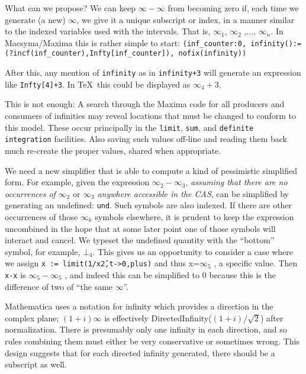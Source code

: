 \documentclass{article}
\begin{document}
What can we propose?  We can keep $\infty - \infty$ from becoming zero
if, each time we generate (a new) $\infty$, we give it a unique
subscript or index, in a manner similar to the indexed variables used
with the intervals.  That is, $\infty_1$, $\infty_2$ ,..., $\infty_n$.
In Macsyma/Maxima this is rather simple to start:
{\tt (inf\_counter:0,
infinity():=(?incf(inf\_counter),Infty[inf\_counter]), nofix(infinity))}

After this, any mention of {\tt infinity} as in {\tt infinity+3} will generate
an expression like {\tt Infty[4]+3}. In \TeX\ this could be displayed
as
$\infty_4+3$.

This is not enough: A search through the Maxima code for all producers and
consumers of infinities may reveal locations that must be changed to
conform to this model. These occur principally in the {\tt limit}, {\tt sum}, and
{\tt definite integration} facilities.  Also saving such values off-line and reading
them back much re-create the proper values, shared when appropriate.

We need a new simplifier that is able to compute a kind of pessimistic
simplified form. For example, given the expression $\infty_2-
\infty_3$, {\em assuming that there are no occurrences of} $\infty_2$
or $\infty_3$ {\em anywhere accessible in the CAS}, can be simplified
by generating an undefined: {\tt und}. Such symbols are also
indexed. If there are other occurrences of those $\infty_k$ symbols elsewhere, it
is prudent to keep the expression uncombined in the hope that at some
later point one of those symbols will interact and cancel.  We typeset
the undefined quantity with the ``bottom'' symbol, for example,
$\bot_4$.
This gives us an opportunity to consider a case where we assign {\tt x :=
limit(1/x\^2,t->0,plus)} and thus x=$\infty_5$ , a specific value. Then
{\tt x-x} is $\infty_5-\infty_5$ , and indeed this can be simplified
to $0$ because this is the difference of two of ``the same $\infty$''.

Mathematica uses a notation for infinity which provides a direction in
the complex plane; $(1+i)\infty$ is effectively
DirectedInfinity($(1+i)/\sqrt{2}$) after normalization. There is
presumably only one infinity in each direction, and so rules combining
them must either be very conservative or sometimes wrong. This design
suggests that for each directed infinity generated, there should be a
subscript as well.
\end{document}
